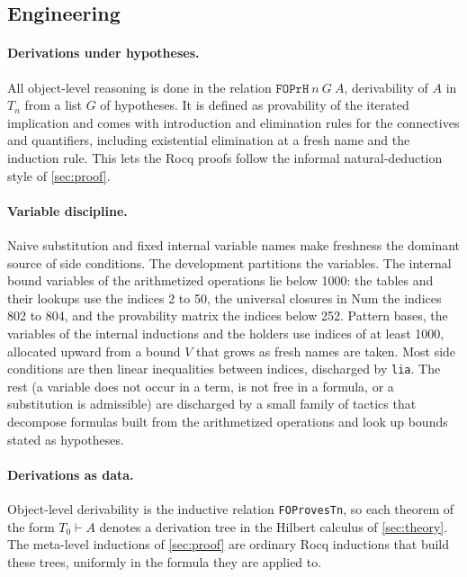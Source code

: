 \documentclass[11pt]{article}
\theoremstyle{plain}
\theoremstyle{definition}
\theoremstyle{remark}
\newcommand{\T}[1]{T_{#1}}
\newcommand{\Num}{\mathrm{Num}}
\newcommand{\rocq}[1]{\texttt{#1}}
\begin{document}
\subsection{Engineering}

\paragraph{Derivations under hypotheses.}
All object-level reasoning is done in the relation
$\rocq{FOPrH}\ n\ G\ A$, derivability of $A$ in $\T{n}$ from a list $G$
of hypotheses.  It is defined as provability of the iterated implication
and comes with introduction and elimination rules for the connectives
and quantifiers, including existential elimination at a fresh name and
the induction rule.  This lets the Rocq proofs follow the informal
natural-deduction style of \cref{sec:proof}.

\paragraph{Variable discipline.}
Naive substitution and fixed internal variable names make freshness the
dominant source of side conditions.  The development partitions the
variables.  The internal bound variables of the arithmetized operations
lie below 1000: the tables and their lookups use the indices 2 to 50,
the universal closures in $\Num$ the indices 802 to 804, and the
provability matrix the indices below 252.  Pattern bases, the variables
of the internal inductions and the holders use indices of at least 1000,
allocated upward from a bound $V$ that grows as fresh names are taken.  Most side
conditions are then linear inequalities between indices, discharged by
\texttt{lia}.  The rest (a variable does not occur in a term, is not
free in a formula, or a substitution is admissible) are discharged by a
small family of tactics that decompose formulas built from the
arithmetized operations and look up bounds stated as hypotheses.

\paragraph{Derivations as data.}
Object-level derivability is the inductive relation
\rocq{FOProvesTn}, so each theorem of the form $\T0 \vdash A$ denotes a
derivation tree in the Hilbert calculus of \cref{sec:theory}.  The
meta-level inductions of \cref{sec:proof} are ordinary Rocq inductions
that build these trees, uniformly in the formula they are applied to.
\end{document}
